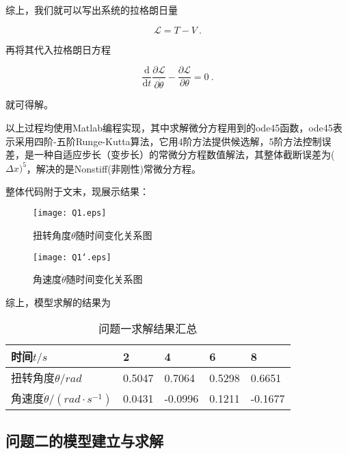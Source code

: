 \documentclass[a4paper,c5size,twoside,UTF8]{ctexart} %
\numberwithin{equation}{section}   %
\begin{document}
综上，我们就可以写出系统的拉格朗日量

\begin{equation}
    \mathcal{L}=T-V~.
\end{equation}

再将其代入拉格朗日方程

\begin{equation}
\frac{\mathrm{d}}{\mathrm{d} t} \frac{\partial \mathcal{L}}{\partial \dot{\theta}}-\frac{\partial \mathcal{L}}{\partial \theta}=0~.
\end{equation}

就可得解。

\newpage 

以上过程均使用Matlab编程实现，其中求解微分方程用到的ode45函数，ode45表示采用四阶-五阶Runge-Kutta算法，它用4阶方法提供候选解，5阶方法控制误差，是一种自适应步长（变步长）的常微分方程数值解法，其整体截断误差为($\Delta x)^5$，解决的是Nonstiff(非刚性)常微分方程。

整体代码附于文末，现展示结果：


\begin{figure}[H]
	\centering
	\texttt{[image: Q1.eps]}
	\caption{扭转角度$\theta$随时间变化关系图}
\end{figure}

\begin{figure}[H]
	\centering
	\texttt{[image: Q1‘.eps]}
	\caption{角速度$\dot{\theta}$随时间变化关系图}
\end{figure}

综上，模型求解的结果为

\begin{table}[H]
    \centering
    \caption{问题一求解结果汇总}
    \begin{tabular}{|l|l|l|l|l|}
        \hline
        时间$t/s$                             & 2      & 4       & 6      & 8       \\ \hline
        扭转角度$\theta/rad$                      & 0.5047 & 0.7064  & 0.5298 & 0.6651  \\ \hline
        角速度$\dot{\theta}/(rad \cdot s^{-1})$ & 0.0431 & -0.0996 & 0.1211 & -0.1677 \\ \hline
        \end{tabular}
    \end{table}
	


\subsection{问题二的模型建立与求解}
\end{document}
